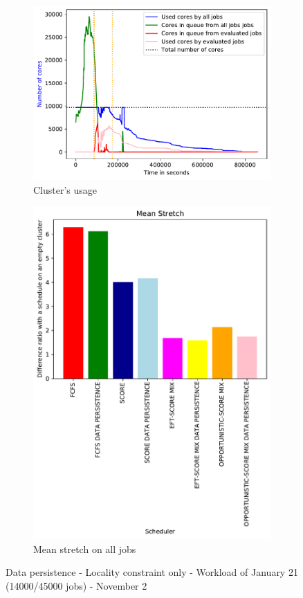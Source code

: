 \documentclass[a4paper]{article}
\begin{document}
\begin{figure}[H]\centering
\begin{subfigure}[b]{0.4\linewidth}\centering\includegraphics[width=1\linewidth]{MBSS/plot/2022-01-21->2022-01-21_V9271_Fcfs_Used_nodes_450_128_32_256_4_1024.pdf}\caption{Cluster's usage}\end{subfigure}
\begin{subfigure}[b]{0.4\linewidth}\centering\includegraphics[width=0.9\linewidth]{MBSS/plot/Results_Data_Persistence_2022-01-21->2022-01-21_V9271_Mean_Stretch_450_128_32_256_4_1024.pdf}\caption{Mean stretch on all jobs}\end{subfigure}
\caption{Data persistence - Locality constraint only - Workload of January 21 (14000/45000 jobs) - November 2}\end{figure}
\end{document}
